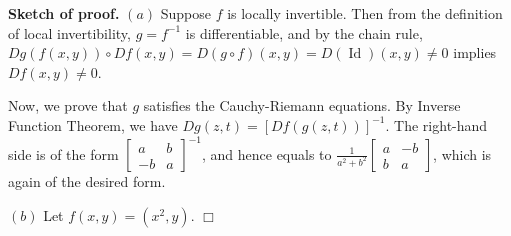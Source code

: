 \documentclass{article}
\begin{document}
    \textbf{Sketch of proof.} $(a)$ Suppose $f$ is locally invertible. Then
from the definition of local invertibility, $g=f^{-1}$ is
differentiable, and by the chain rule,
$Dg(f(x,y)) \circ Df(x,y) = D(g\circ f)(x,y) = D(\operatorname{Id})(x,y) \ne 0$
implies $Df(x,y) \ne 0$.

Now, we prove that $g$ satisfies the Cauchy-Riemann equations. By
Inverse Function Theorem, we have $Dg(z, t) = [Df(g(z, t))]^{-1}$. The
right-hand side is of the form
$\begin{bmatrix}a & b \\ -b & a\end{bmatrix}^{-1}$, and hence equals to
$\frac{1}{a^2+b^2}\begin{bmatrix}a & -b \\ b & a\end{bmatrix}$, which is
again of the desired form.

$(b)$ Let $f(x,y) = (x^2,y)$. $\Box$


    
    
    
    
\end{document}
